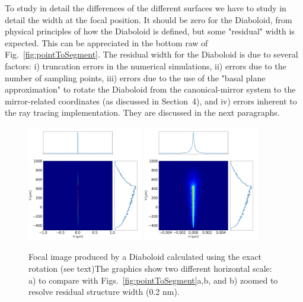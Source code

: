 \documentclass[a4paper, 11pt]{article}
\begin{document}
To study in detail the differences of the different surfaces we have to study in detail the width at the focal position. It should be zero for the Diaboloid, from physical principles of how the Diaboloid is defined, but some "residual" width is expected. This can be appreciated in the bottom raw of Fig.~\ref{fig:pointToSegment}. The residual width for the Diaboloid is due to several factors: i) truncation errors in the numerical simulations, ii) errors due to the number of sampling points, iii) errors due to the use of the "basal plane approximation" to rotate the Diaboloid from the canonical-mirror system to the mirror-related coordinates (as discussed in Section~4), and iv) errors inherent to the ray tracing implementation. They are discussed in the next paragraphs.

\begin{figure}[h]
\centering
\includegraphics[width=0.45\textwidth]{figures/p2s_mathematica1.png}
\includegraphics[width=0.45\textwidth]{figures/p2s_matematica2.png}
\caption{\label{fig:mathematica}Focal image produced by a Diaboloid calculated using the exact rotation (see text)The graphics show two different horizontal scale: a) to compare with Figs.~\ref{fig:pointToSegment}a,b, and b) zoomed to resolve residual structure width (0.2 nm).
}
\end{figure}


\end{document}
